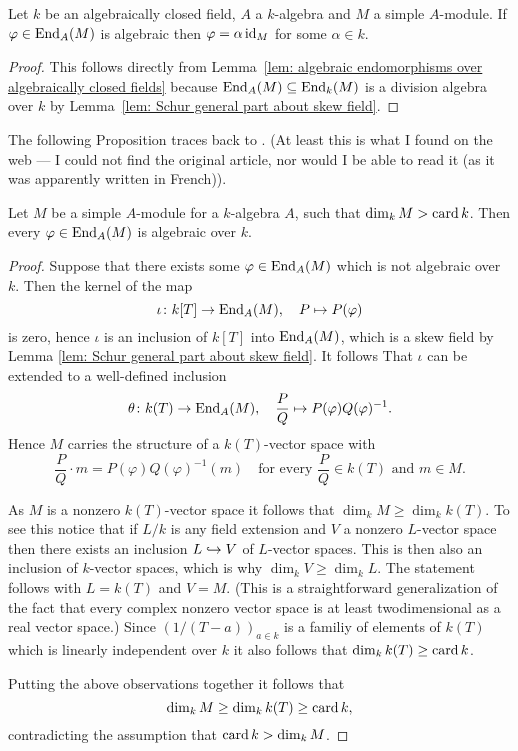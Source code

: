 \begin{cor}\label{cor: Schur generally needs only algebraic endomorphisms}
 Let $k$ be an algebraically closed field, $A$ a $k$-algebra and $M$ a simple $A$-module. If $\varphi \in \operatorname{End}_A(M)$ is algebraic then $\varphi = \alpha \operatorname{id}_M$ for some $\alpha \in k$.
\end{cor}
\begin{proof}
 This follows directly from Lemma~\ref{lem: algebraic endomorphisms over algebraically closed fields} because $\operatorname{End}_A(M) \subseteq \operatorname{End}_k(M)$ is a division algebra over $k$ by Lemma~\ref{lem: Schur general part about skew field}.
\end{proof}


The following Proposition traces back to \cite{Dixmier}. (At least this is what I found on the web --- I could not find the original article, nor would I be able to read it (as it was apparently written in French)).


\begin{prop}[Dixmier]\label{prop: Dixmier}
 Let $M$ be a simple $A$-module for a $k$-algebra $A$, such that $\dim_k M > \operatorname{card} k$. Then every $\varphi \in \operatorname{End}_A(M)$ is algebraic over $k$.
\end{prop}
\begin{proof}
 Suppose that there exists some $\varphi \in \operatorname{End}_A(M)$ which is not algebraic over $k$. Then the kernel of the map
 \[
  \iota \colon k[T] \to \operatorname{End}_A(M), \quad P \mapsto P(\varphi)
 \]
 is zero, hence $\iota$ is an inclusion of $k[T]$ into $\operatorname{End}_A(M)$, which is a skew field by Lemma \ref{lem: Schur general part about skew field}. It follows That $\iota$ can be extended to a well-defined inclusion
 \[
  \theta \colon k(T) \to \operatorname{End}_A(M), \quad \frac{P}{Q} \mapsto P(\varphi) Q(\varphi)^{-1}.
 \]
 Hence $M$ carries the structure of a $k(T)$-vector space with
 \[
  \frac{P}{Q} \cdot m = P(\varphi)Q(\varphi)^{-1}(m)
  \quad \text{for every $\frac{P}{Q} \in k(T)$ and $m \in M$}.
 \]
 
 As $M$ is a nonzero $k(T)$-vector space it follows that $\dim_k M \geq \dim_k k(T)$. To see this notice that if $L/k$ is any field extension and $V$ a nonzero $L$-vector space then there exists an inclusion $L \hookrightarrow V$ of $L$-vector spaces. This is then also an inclusion of $k$-vector spaces, which is why $\dim_k V \geq \dim_k L$. The statement follows with $L = k(T)$ and $V = M$. (This is a straightforward generalization of the fact that every complex nonzero vector space is at least twodimensional as a real vector space.) Since $(1/(T-a))_{a \in k}$ is a familiy of elements of $k(T)$ which is linearly independent over $k$ it also follows that $\dim_k k(T) \geq \operatorname{card} k$.

 Putting the above observations together it follows that
 \[
  \dim_k M \geq \dim_k k(T) \geq \operatorname{card} k,
 \]
 contradicting the assumption that $\operatorname{card} k > \dim_k M$.
\end{proof}


